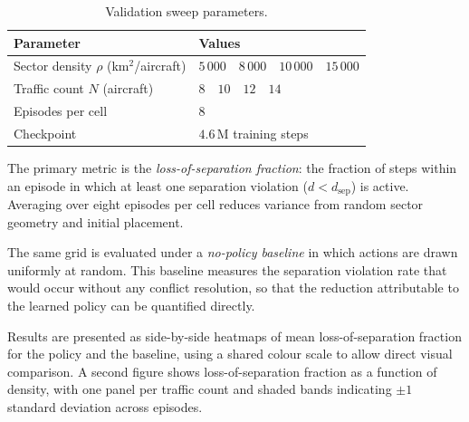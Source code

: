 \documentclass[11pt, a4paper]{article}
\begin{document}
\begin{table}[h]
\centering
\caption{Validation sweep parameters.}
\label{tab:sweep}
\smallskip
\begin{tabular}{ll}
\toprule
\textbf{Parameter} & \textbf{Values} \\
\midrule
Sector density $\rho$ (km$^2$/aircraft) & $5\,000 \quad 8\,000 \quad 10\,000 \quad 15\,000$ \\
Traffic count $N$ (aircraft)            & $8 \quad 10 \quad 12 \quad 14$ \\
Episodes per cell                       & $8$ \\
Checkpoint                              & $4.6\,\text{M}$ training steps \\
\bottomrule
\end{tabular}
\end{table}

The primary metric is the \textit{loss-of-separation fraction}: the fraction
of steps within an episode in which at least one separation violation ($d < d_\text{sep}$)
is active.
Averaging over eight episodes per cell reduces variance from random sector
geometry and initial placement.

The same grid is evaluated under a \textit{no-policy baseline} in which
actions are drawn uniformly at random.
This baseline measures the separation violation rate that would occur without
any conflict resolution, so that the reduction attributable to the learned
policy can be quantified directly.

Results are presented as side-by-side heatmaps of mean loss-of-separation
fraction for the policy and the baseline, using a shared colour scale to
allow direct visual comparison.
A second figure shows loss-of-separation fraction as a function of density,
with one panel per traffic count and shaded bands indicating $\pm 1$ standard
deviation across episodes.
\end{document}
